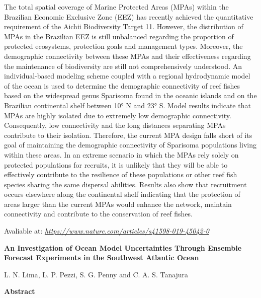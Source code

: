 \noindent The total spatial coverage of Marine Protected Areas (MPAs) within the Brazilian Economic Exclusive Zone (EEZ) has recently achieved the quantitative requirement of the Aichii 
          Biodiversity Target 11. However, the distribution of MPAs in the Brazilian EEZ is still unbalanced regarding the proportion of protected ecosystems, protection goals and management types. 
          Moreover, the demographic connectivity between these MPAs and their effectiveness regarding the maintenance of biodiversity are still not comprehensively understood. An individual-based
          modeling scheme coupled with a regional hydrodynamic model of the ocean is used to determine the demographic connectivity of reef fishes based on the widespread genus Sparisoma found in 
          the oceanic islands and on the Brazilian continental shelf between 10° N and 23° S. Model results indicate that MPAs are highly isolated due to extremely low demographic connectivity. 
          Consequently, low connectivity and the long distances separating MPAs contribute to their isolation. Therefore, the current MPA design falls short of its goal of maintaining the demographic
          connectivity of Sparisoma populations living within these areas. In an extreme scenario in which the MPAs rely solely on protected populations for recruits, it is unlikely that they will be 
          able to effectively contribute to the resilience of these populations or other reef fish species sharing the same dispersal abilities. Results also show that recruitment occurs elsewhere 
          along the continental shelf indicating that the protection of areas larger than the current MPAs would enhance the network, maintain connectivity and contribute to the conservation of reef fishes.
\bigskip

\noindent \textcolor{black}{}
\bigskip

\noindent Avaliable at: \textcolor{bleu_cite}{\href{https://www.nature.com/articles/s41598-019-45042-0}{\textit{https://www.nature.com/articles/s41598-019-45042-0}}}
\bigskip


\newpage
\noindent \begin{center}
\textbf{An Investigation of Ocean Model Uncertainties Through Ensemble Forecast Experiments in the Southwest Atlantic Ocean}
\bigskip

\noindent L. N. Lima, L. P. Pezzi, S. G. Penny and C. A. S. Tanajura
\bigskip

\noindent \textbf{Abstract}\end{center}
\bigskip

